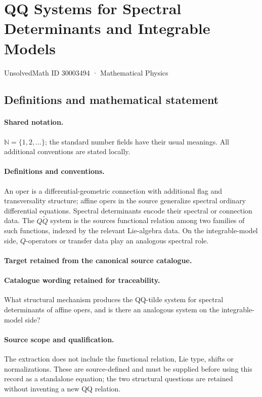 \documentclass[11pt]{article}
\begin{document}
\setcounter{section}{30003493}
\section{QQ Systems for Spectral Determinants and Integrable Models}\label{30003494}
{\small UnsolvedMath ID 30003494 · Mathematical Physics}
\subsection{Definitions and mathematical statement}

\paragraph{Shared notation.}$\mathbb N=\{1,2,\ldots\}$; the standard number fields have their usual meanings. All additional conventions are stated locally.


\paragraph{Definitions and conventions.}
An oper is a differential-geometric connection with additional flag and transversality structure; affine opers in the source generalize spectral ordinary differential equations. Spectral determinants encode their spectral or connection data. The $Q\widetilde Q$ system is the source\textquotesingle s functional relation among two families of such functions, indexed by the relevant Lie-algebra data. On the integrable-model side, $Q$-operators or transfer data play an analogous spectral role.

\paragraph{Target retained from the canonical source catalogue.}
\paragraph{Catalogue wording retained for traceability.}
What structural mechanism produces the QQ-tilde system for spectral determinants of affine opers, and is there an analogous system on the integrable-model side?

\paragraph{Source scope and qualification.}
The extraction does not include the functional relation, Lie type, shifts or normalizations. These are source-defined and must be supplied before using this record as a standalone equation; the two structural questions are retained without inventing a new QQ relation.
\end{document}
